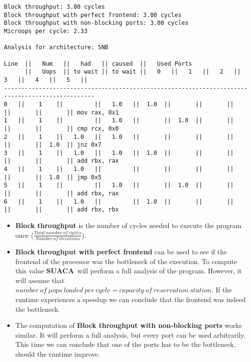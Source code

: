 \documentclass[a4paper,12pt,titlepage, twoside]{report}
\newcommand{\suaca}{\textbf{SUACA}}
\begin{document}
\begin{lstlisting}
Block throughput: 3.00 cycles
Block throughput with perfect frontend: 3.00 cycles
Block throughput with non-blocking ports: 3.00 cycles
Microops per cycle: 2.33

Analysis for architecture: SNB

Line  ||   Num   ||   had   || caused  ||   Used Ports
      ||   Uops  || to wait || to wait ||   0   ||   1   ||   2   ||   3   ||   4   ||   5   ||
------------------------------------------------------------------------------------------------
0   ||    1    ||         ||   1.0   ||  1.0  ||       ||       ||       ||       ||       || mov rax, 0x1
1   ||    1    ||         ||   1.0   ||       ||  1.0  ||       ||       ||       ||       || cmp rcx, 0x0
2   ||    1    ||   1.0   ||   1.0   ||       ||       ||       ||       ||       ||  1.0  || jnz 0x7
3   ||    1    ||   1.0   ||   1.0   ||  1.0  ||       ||       ||       ||       ||       || add rbx, rax
4   ||    1    ||   1.0   ||         ||       ||       ||       ||       ||       ||  1.0  || jmp 0x5
5   ||    1    ||         ||   1.0   ||       ||  1.0  ||       ||       ||       ||       || add rbx, rax
6   ||    1    ||   1.0   ||         ||  1.0  ||       ||       ||       ||       ||       || add rbx, rbx
\end{lstlisting}

\begin{itemize}
    \item \textbf{Block throughput} is the number of cycles needed to execute the program once ($\frac{Total\ number\ of\ cycles}{Number\ of\ iterations}$).
    \item \textbf{Block throughput with perfect frontend} can be used to see if the frontend of the processor was the bottleneck of the execution. To compute this value \suaca\ will perform a full analysis of the program. However, it will assume that $number\ of\ \mu ops\ loaded\ per\ cycle = capacity\ of\ reservation\ station$. If the runtime experiences a speedup we can conclude that the frontend was indeed the bottleneck.
    \item The computation of \textbf{Block throughput with non-blocking ports} works similar. It will perform a full analysis, but every port can be used arbitrarily. This time we can conclude that one of the ports has to be the bottleneck, should the runtime improve.
\end{itemize}
\end{document}
